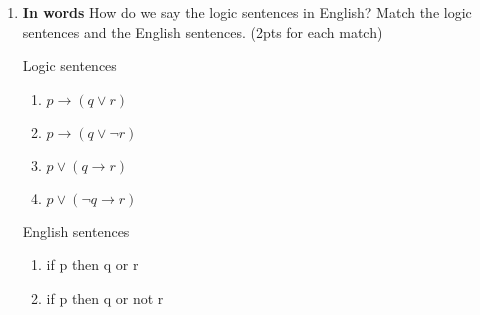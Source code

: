 \documentclass[a4,11pt]{article}
\newcommand{\6}{\mbox{$[\hspace*{-.6mm}[$}}
\newcommand{\9}{\mbox{$]\hspace*{-.6mm}]$}}
\begin{document}
\begin{enumerate}[leftmargin = 12pt]
Answer: If the English conditional sentence  {\em If the moon is made of green cheese, then I had yoghurt for breakfast} is analyzed using the material conditional, \ldots

\begin{enumerate}
\item \ldots then the conditional sentence is predicted to be true, because the antecedent is false. That does not make sense because native speakers would not judge the English conditional sentence to be true. (3 pts)

\item \ldots then the consequent is predicted to be true, because the antecedent is false. That does not make sense because the consequent does not have to be true.  (0 pts)

\end{enumerate}

{ \bf Model answer:}  Answer (a) is correct. If the English conditional sentence  {\em If the moon is made of green cheese, then I had yoghurt for breakfast} is analyzed using the material conditional, then the conditional sentence is predicted to be true because the antecedent is false, and that does not accord with native speaker intuitions. Answer (b) is incorrect because the consequent is not predicted to be true; rather, the consequent can be true or false if the antecedent is false.

\item {\bf  In words} How do we say the logic sentences in English? Match the logic sentences and the English sentences. (2pts for each match)

Logic sentences

\begin{enumerate}
\item $p \rightarrow (q \vee r)$

\item $p \rightarrow (q \vee \neg r)$

\item $p \vee (q \rightarrow r)$

\item $p \vee (\neg q \rightarrow r)$

\end{enumerate}

English sentences

\begin{enumerate}
\item if p then q or r

\item if p then q or not r


\end{enumerate}
\end{enumerate}
\end{document}
